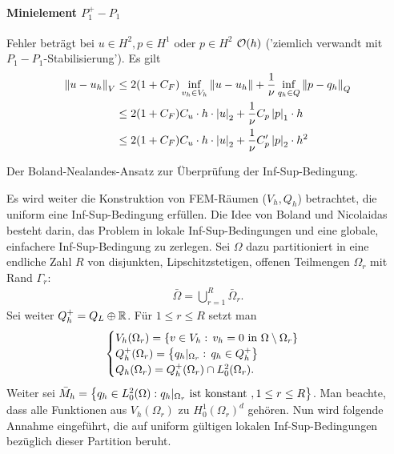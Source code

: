 \paragraph{Minielement $P_1^+-P_1$}
Fehler beträgt bei $u \in H^{2}, p \in H^{1}$ oder $p \in H^{2}$ ${\cal O}(h)$ ('ziemlich verwandt mit $P_{1}-P_{1}$-Stabilisierung'). Es gilt
\begin{align*}
  \left \|u -u_{h} \right\|_{V} &\leq 2(1 + C_{F}) \inf_{v_{h} \in V_{h}} \left \|u-u_{h} \right\| + \frac 1 \nu \inf_{q_{h}\in Q} \left \|p-q_{h} \right\|_{Q}\\
&  \leq 2(1 + C_{F})C_{u} \cdot h\cdot \left|u\right|_{2} + \frac 1 \nu C_{p}\left|p\right|_{1}\cdot h\\
&  \leq 2(1 + C_{F})C_{u} \cdot h\cdot \left|u\right|_{2} + \frac 1 \nu C'_{p}\left|p\right|_{2}\cdot h^{2}
\end{align*}
\begin{bemerkung} Der Boland-Nealandes-Ansatz zur Überprüfung der Inf-Sup-Bedingung. 

Es wird weiter die Konstruktion von FEM-Räumen ($V_{h}, Q_{h}$) betrachtet, die uniform eine Inf-Sup-Bedingung erfüllen. Die Idee von Boland und Nicolaidas besteht darin, das Problem in lokale Inf-Sup-Bedingungen und eine globale, einfachere Inf-Sup-Bedingung zu zerlegen. Sei $\Omega$ dazu partitioniert in eine endliche Zahl $R$ von disjunkten, Lipschitzstetigen, offenen Teilmengen $\Omega_{r}$ mit Rand $\Gamma_{r}$:
\begin{align*}
  \bar \Omega = \bigcup_{r = 1}^{R} \bar \Omega_{r}. 
\end{align*}
Sei weiter $Q_{h}^{+} = Q_{L} \oplus \mathbb{R}$. Für $1 \leq r \leq R$ setzt man
\begin{align*}
  \begin{cases}
    V_{h}(\Omega_{r}) = \left\{ v \in V_{h}: \, v_{h} = 0 \text{ in } \Omega\setminus \Omega_{r} \right\}\\
    Q_{h}^{+}(\Omega_{r}) = \left\{ q_{h}|_{\Omega_{r}}: \, q_{h} \in Q_{h}^{+} \right\}\\
    Q_{h}(\Omega_{r}) = Q_{h}^{+}(\Omega_{r})\cap L_{0}^{2}(\Omega_{r}). 
  \end{cases}
\end{align*}
Weiter sei $\bar M_{h}= \left\{ q_{h} \in L_{0}^{2}(\Omega): q_{h}|_{\Omega_{r}} \text{ ist konstant }, 1 \leq r \leq R \right\}$. Man beachte, dass alle Funktionen aus $V_{h}(\Omega_{r})$ zu $H_{0}^{1}(\Omega_{r})^{d}$ gehören. Nun wird folgende Annahme eingeführt, die auf uniform gültigen lokalen Inf-Sup-Bedingungen bezüglich dieser Partition beruht. 
\end{bemerkung}
